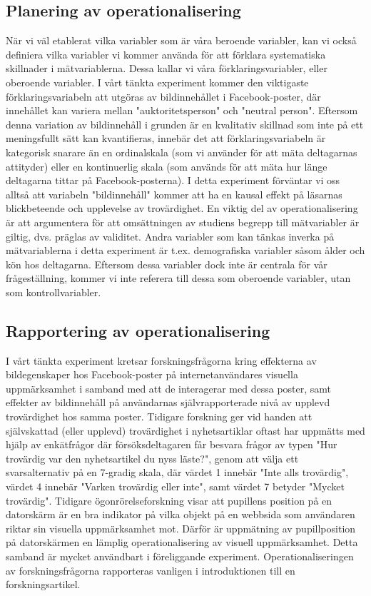 \documentclass[
]{book}
\begin{document}
\hypertarget{sub06.2.1}{%
\subsection{Planering av operationalisering}\label{sub06.2.1}}

När vi väl etablerat vilka variabler som är våra beroende variabler, kan vi också definiera vilka variabler vi kommer använda för att förklara systematiska skillnader i mätvariablerna. Dessa kallar vi våra förklaringsvariabler, eller oberoende variabler. I vårt tänkta experiment kommer den viktigaste förklaringsvariabeln att utgöras av bildinnehållet i Facebook-poster, där innehållet kan variera mellan "auktoritetsperson" och "neutral person". Eftersom denna variation av bildinnehåll i grunden är en kvalitativ skillnad som inte på ett meningsfullt sätt kan kvantifieras, innebär det att förklaringsvariabeln är kategorisk snarare än en ordinalskala (som vi använder för att mäta deltagarnas attityder) eller en kontinuerlig skala (som används för att mäta hur länge deltagarna tittar på Facebook-posterna). I detta experiment förväntar vi oss alltså att variabeln "bildinnehåll" kommer att ha en kausal effekt på läsarnas blickbeteende och upplevelse av trovärdighet. En viktig del av operationalisering är att argumentera för att omsättningen av studiens begrepp till mätvariabler är giltig, dvs. präglas av validitet. Andra variabler som kan tänkas inverka på mätvariablerna i detta experiment är t.ex. demografiska variabler såsom ålder och kön hos deltagarna. Eftersom dessa variabler dock inte är centrala för vår frågeställning, kommer vi inte referera till dessa som oberoende variabler, utan som kontrollvariabler.

\hypertarget{sub06.2.2}{%
\subsection{Rapportering av operationalisering}\label{sub06.2.2}}

I vårt tänkta experiment kretsar forskningsfrågorna kring effekterna av bildegenskaper hos Facebook-poster på internetanvändares visuella uppmärksamhet i samband med att de interagerar med dessa poster, samt effekter av bildinnehåll på användarnas självrapporterade nivå av upplevd trovärdighet hos samma poster. Tidigare forskning ger vid handen att självskattad (eller upplevd) trovärdighet i nyhetsartiklar oftast har uppmätts med hjälp av enkätfrågor där försöksdeltagaren får besvara frågor av typen "Hur trovärdig var den nyhetsartikel du nyss läste?", genom att välja ett svarsalternativ på en 7-gradig skala, där värdet 1 innebär "Inte alls trovärdig", värdet 4 innebär "Varken trovärdig eller inte", samt värdet 7 betyder "Mycket trovärdig". Tidigare ögonrörelseforskning visar att pupillens position på en datorskärm är en bra indikator på vilka objekt på en webbsida som användaren riktar sin visuella uppmärksamhet mot. Därför är uppmätning av pupillposition på datorskärmen en lämplig operationalisering av visuell uppmärksamhet. Detta samband är mycket användbart i föreliggande experiment. Operationaliseringen av forskningsfrågorna rapporteras vanligen i introduktionen till en forskningsartikel.
\end{document}
